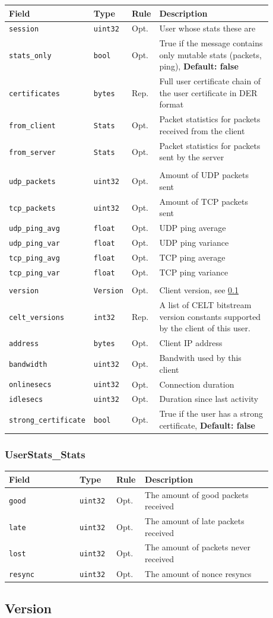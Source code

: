 \documentclass[11pt]{article} %
\newenvironment{mumbleMessageEx}
{%
	\small
	\renewcommand\arraystretch{1.5}
	\begin{tabular}{p{0.25\linewidth}p{0.13\linewidth}p{0.05\linewidth}p{0.45\linewidth}}
	Field & Type & Rule & Description \\
	\hline
}
{%
	\end{tabular}
	\renewcommand\arraystretch{1.0}
}
\newcommand{\mumbleMessageExItem}[4]{ \texttt{#1} & \texttt{#2} & #3 & #4 \\ }
\begin{document}
\begin{mumbleMessageEx}
\mumbleMessageExItem{session}{uint32}{Opt.}{User whose stats these are}
\mumbleMessageExItem{stats\_only}{bool}{Opt.}{True if the message contains only mutable stats (packets, ping), \textbf{Default: false}}
\mumbleMessageExItem{certificates}{bytes}{Rep.}{Full user certificate chain of the user certificate in DER format} %
\mumbleMessageExItem{from\_client}{Stats}{Opt.}{Packet statistics for packets received from the client}
\mumbleMessageExItem{from\_server}{Stats}{Opt.}{Packet statistics for packets sent by the server}
\\
\mumbleMessageExItem{udp\_packets}{uint32}{Opt.}{Amount of UDP packets sent}
\mumbleMessageExItem{tcp\_packets}{uint32}{Opt.}{Amount of TCP packets sent}
\mumbleMessageExItem{udp\_ping\_avg}{float}{Opt.}{UDP ping average}
\mumbleMessageExItem{udp\_ping\_var}{float}{Opt.}{UDP ping variance}
\mumbleMessageExItem{tcp\_ping\_avg}{float}{Opt.}{TCP ping average}
\mumbleMessageExItem{tcp\_ping\_var}{float}{Opt.}{TCP ping variance}
\\
\mumbleMessageExItem{version}{Version}{Opt.}{Client version, see \ref{msg:version}}
\mumbleMessageExItem{celt\_versions}{int32}{Rep.}{A list of CELT bitstream version constants supported by the client of this user.}
\mumbleMessageExItem{address}{bytes}{Opt.}{Client IP address}
\mumbleMessageExItem{bandwidth}{uint32}{Opt.}{Bandwith used by this client}
\mumbleMessageExItem{onlinesecs}{uint32}{Opt.}{Connection duration}
\mumbleMessageExItem{idlesecs}{uint32}{Opt.}{Duration since last activity}
\mumbleMessageExItem{strong\_certificate}{bool}{Opt.}{True if the user has a strong certificate, \textbf{Default: false}}
\end{mumbleMessageEx}

\subsubsection{UserStats\_Stats}
\label{msg:userStats:stats}

\begin{mumbleMessageEx}
\mumbleMessageExItem{good}{uint32}{Opt.}{The amount of good packets received}
\mumbleMessageExItem{late}{uint32}{Opt.}{The amount of late packets received}
\mumbleMessageExItem{lost}{uint32}{Opt.}{The amount of packets never received}
\mumbleMessageExItem{resync}{uint32}{Opt.}{The amount of nonce resyncs}
\end{mumbleMessageEx}

\subsection{Version}
\label{msg:version}
\end{document}
